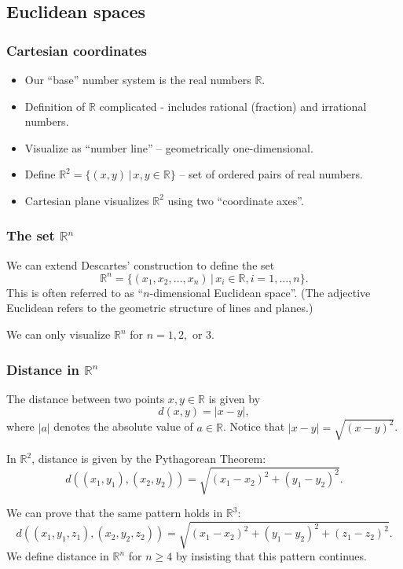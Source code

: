 \documentclass[11pt,t]{beamer}
\newcommand{\R}{\mathbb{R}}
\newcommand{\abs}[1]{\lvert #1\rvert}
\begin{document}
\subsection{Euclidean spaces}
\begin{frame}
\frametitle{Cartesian coordinates}
\begin{itemize}
\item Our ``base'' number system is the \alert{real numbers} $\R$.
\item Definition of $\R$ complicated - includes rational (fraction) and irrational numbers.
\item Visualize as ``number line'' -- geometrically one-dimensional.
\item Define $\R^2 = \{(x,y)\,|\, x,y\in\R\}$ -- set of \alert{ordered pairs} of real numbers.
\item \alert{Cartesian plane} visualizes $\R^2$ using two ``coordinate axes''.
\end{itemize}
\end{frame}
\begin{frame}
\frametitle{The set $\R^n$}
We can extend Descartes' construction to define the set
\[
\R^n = \{(x_1,x_2,\ldots, x_n) \,|\, x_i\in\R, i=1,\ldots, n\}.
\]
This is often referred to as ``$n$-dimensional Euclidean space''. (The adjective \alert{Euclidean} refers to the geometric structure of lines and planes.)

We can only visualize $\R^n$ for $n=1,2,$ or 3.
\end{frame}
\begin{frame}
\frametitle{Distance in $\R^n$}

The \alert{distance} between two points $x,y\in\R$ is given by
\[
d(x,y) = \abs{x-y},
\]
where $\abs{a}$ denotes the \alert{absolute value} of $a\in \R$. Notice that $\abs{x-y} = \sqrt{(x-y)^2}$.

\bigskip

In $\R^2$, distance is given by the Pythagorean Theorem:
\[
d((x_1,y_1),(x_2,y_2)) = \sqrt{(x_1-x_2)^2+(y_1-y_2)^2}.
\]

We can prove that the same pattern holds in $\R^3$:
\[
d((x_1,y_1,z_1),(x_2,y_2,z_2)) = \sqrt{(x_1-x_2)^2+(y_1-y_2)^2+(z_1-z_2)^2}.
\]
We \alert{define} distance in $\R^n$ for $n\geq 4$ by insisting that this pattern continues.

\end{frame}
\end{document}
